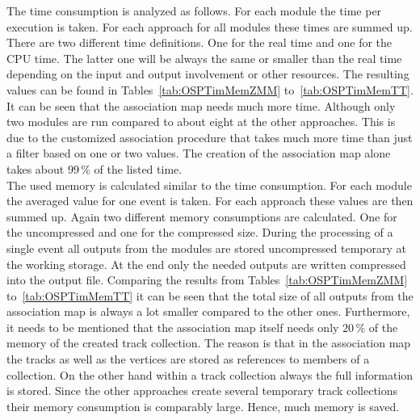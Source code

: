The time consumption is analyzed as follows. For each module the time per execution is taken. For each approach for all modules these times are summed up. There are two different time definitions. One for the real time and one for the CPU time. The latter one will be always the same or smaller than the real time depending on the input and output involvement or other resources. The resulting values can be found in Tables~\ref{tab:OSPTimMemZMM} to~\ref{tab:OSPTimMemTT}. It can be seen that the association map needs much more time. Although only two modules are run compared to about eight at the other approaches. This is due to the customized association procedure that takes much more time than just a filter based on one or two values. The creation of the association map alone takes about $99\,\%$ of the listed time. \\
The used memory is calculated similar to the time consumption. For each module the averaged value for one event is taken. For each approach these values are then summed up. Again two different memory consumptions are calculated. One for the uncompressed and one for the compressed size. During the processing of a single event all outputs from the modules are stored uncompressed temporary at the working storage. At the end only the needed outputs are written compressed into the output file. Comparing the results from Tables~\ref{tab:OSPTimMemZMM} to~\ref{tab:OSPTimMemTT} it can be seen that the total size of all outputs from the association map is always a lot smaller compared to the other ones. Furthermore, it needs to be mentioned that the association map itself needs only $20\,\%$ of the memory of the created track collection. The reason is that in the association map the tracks as well as the vertices are stored as references to members of a collection. On the other hand within a track collection always the full information is stored. Since the other approaches create several temporary track collections their memory consumption is comparably large. Hence, much memory is saved.

